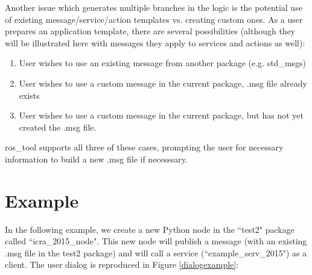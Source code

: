 \documentclass[letterpaper, 10 pt, conference]{ieeeconf}  %
\begin{document}
Another issue which generates multiple branches in the logic is the potential use of existing message/service/action templates vs. creating custom ones.  As a user prepares an application template, there are several possibilities (although they will be illustrated here with messages they apply to services and actions as well):
\begin{enumerate}
  \item User wishes to use an existing message from another package (e.g. std\_msgs)
  \item User wishes to use a custom message in the current package, .msg file already exists
  \item User wishes to use a custom message in the current package, but has not yet created the .msg file.
\end{enumerate}
ros\_tool supports all three of these cases, prompting the user for necessary information to build a new .msg file if necesssary.

\section{Example}
In the following example, we create a new Python node in the ``test2" package called ``icra\_2015\_node".  This new node will publish a message (with an existing .msg file in the test2 package) and will call a service (``example\_serv\_2015") as a client.   The user dialog is reproduced in Figure \ref{dialogexample}:
\end{document}
